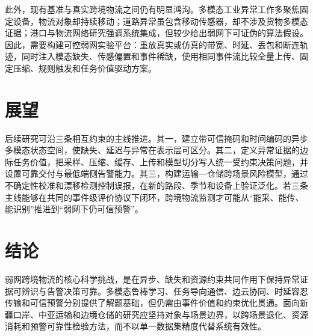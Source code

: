 \documentclass[11pt,a4paper]{article}
\begin{document}
此外，现有基准与真实跨境物流之间仍有明显鸿沟。多模态工业异常工作多聚焦固定设备，物流对象却持续移动；道路异常虽包含移动传感器，却不涉及货物多模态证据；港口与物流网络研究强调系统集成，但较少给出弱网下可证伪的算法假设。因此，需要构建可控弱网实验平台：重放真实或仿真的带宽、时延、丢包和断连轨迹，同时注入模态缺失、传感偏置和事件稀缺，使用相同事件流比较全量上传、固定压缩、规则触发和任务价值驱动方案。

\section{展望}

后续研究可沿三条相互约束的主线推进。其一，建立带可信掩码和时间编码的异步多模态状态空间，使缺失、延迟与异常在表示层可区分。其二，定义异常证据的边际任务价值，把采样、压缩、缓存、上传和模型切分写入统一受约束决策问题，并设置可靠交付与最低端侧告警能力。其三，构建运输—仓储跨场景风险模型，通过不确定性校准和漂移检测控制误报，在新的路段、季节和设备上验证泛化。若三条主线能够在共同的事件级评价协议下闭环，跨境物流监测才可能从“能采、能传、能识别”推进到“弱网下仍可信预警”。

\section{结论}

弱网跨境物流的核心科学挑战，是在异步、缺失和资源约束共同作用下保持异常证据可辨识与告警决策可靠。多模态鲁棒学习、任务导向通信、边云协同、时延容忍传输和可信预警分别提供了解题基础，但仍需由事件价值和约束优化贯通。面向新疆口岸、中亚运输和边境仓储的研究应坚持对象与场景边界，以跨场景退化、资源消耗和预警可靠性检验方法，而不以单一数据集精度代替系统有效性。



\end{document}
